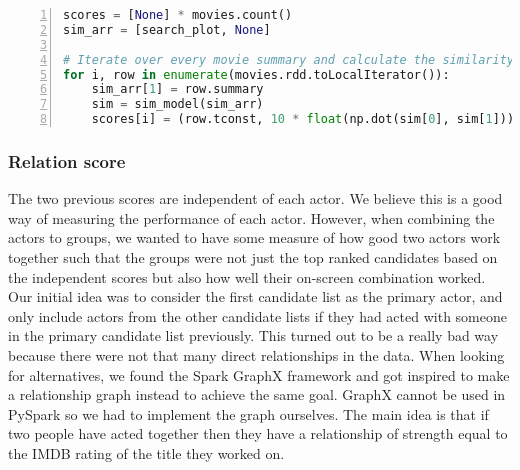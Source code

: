 \begin{lstlisting}[float=h, language=Python, caption=Plot similarity, label=CodeToLocalIterator, numbers=left]
scores = [None] * movies.count()
sim_arr = [search_plot, None]

# Iterate over every movie summary and calculate the similarity score
for i, row in enumerate(movies.rdd.toLocalIterator()):
    sim_arr[1] = row.summary
    sim = sim_model(sim_arr)
    scores[i] = (row.tconst, 10 * float(np.dot(sim[0], sim[1])))
\end{lstlisting}



\subsubsection{Relation score}

The two previous scores are independent of each actor. We believe this is a good way of measuring the performance of each actor. However, when combining the actors to groups, we wanted to have some measure of how good two actors work together such that the groups were not just the top ranked candidates based on the independent scores but also how well their on-screen combination worked. Our initial idea was to consider the first candidate list as the primary actor, and only include actors from the other candidate lists if they had acted with someone in the primary candidate list previously. This turned out to be a really bad way because there were not that many direct relationships in the data. When looking for alternatives, we found the Spark GraphX framework and got inspired to make a relationship graph instead to achieve the same goal. GraphX cannot be used in PySpark so we had to implement the graph ourselves. The main idea is that if two people have acted together then they have a relationship of strength equal to the IMDB rating of the title they worked on.

